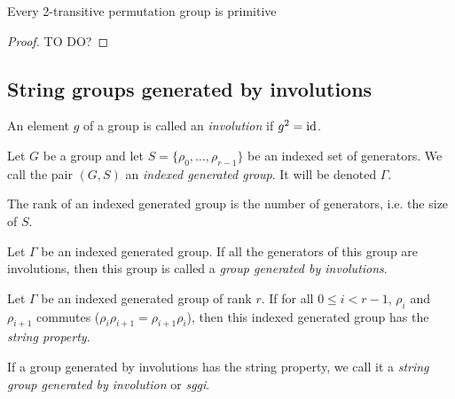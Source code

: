 \begin{property}
  Every 2-transitive permutation group is primitive
\end{property}

\begin{proof}
  TO DO?
\end{proof}

\subsection{String groups generated by involutions}

\begin{definition}[Involution]
  An element $g$ of a group is called an \textit{involution} if $g^2 = \operatorname{id}$.
\end{definition}

\begin{definition}
  Let $G$ be a group and let $S = \{\rho_0, \dots, \rho_{r-1}\}$ be an indexed set of generators.
  We call the pair $(G,S)$ an \textit{indexed generated group}. It will be denoted $\Gamma$.
\end{definition}

\begin{definition}
  The rank of an indexed generated group is the number of generators, i.e. the size of $S$.
\end{definition}

\begin{definition}
  Let $\Gamma$ be an indexed generated group. If all the generators of this group are involutions, then this group is called a \textit{group generated by involutions}.
\end{definition}

\begin{definition}
  Let $\Gamma$ be an indexed generated group of rank $r$. If for all $0 \le i < r-1$, $\rho_i$ and $\rho_{i+1}$ commutes ($\rho_i \rho_{i+1} = \rho_{i+1}\rho_i$), then this indexed generated group has the \textit{string property}.
\end{definition}

\begin{definition}
  If a group generated by involutions has the string property, we call it a \textit{string group generated by involution} or \textit{sggi}.
\end{definition}

